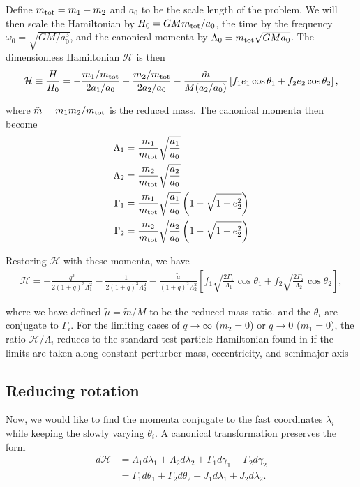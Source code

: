 \documentclass[usenatbib,twocolumn]{mnras}
\begin{document}
\noindent Define \(m_{\rm tot} = m_1+m_2\) and \(a_0\) to be the
scale length of the problem.  We will then scale the Hamiltonian by
\(H_0 = GMm_{\rm tot}/a_0\), the time by the frequency \(\omega_0 =
\sqrt{GM/a_0^3}\), and the canonical momenta by \(\Lambda_0 = m_{\rm
tot} \sqrt{GMa_0}\).  The dimensionless Hamiltonian \(\mathcal{H}\) is
then
\begin{align}
  \mathcal{H} \equiv \frac{H}{H_0}
  = -\frac{m_1/m_{\rm tot}}{2a_1/a_0}
    -\frac{m_2/m_{\rm tot}}{2a_2/a_0}
  -\frac{\tilde m}{M (a_2/a_0)}\left[
    f_1e_1\cos\theta_1+f_2e_2\cos\theta_2
    \right],
\end{align}

\noindent
where \(\tilde m = m_1m_2/m_{\rm tot}\) is the reduced mass.
The canonical momenta then become
\begin{align}
  \Lambda_1 &= \frac{m_1}{m_{\rm tot}}\sqrt{\frac{a_1}{a_0}} \\
  \Lambda_2 &= \frac{m_2}{m_{\rm tot}}\sqrt{\frac{a_2}{a_0}} \\
  \Gamma_1 &= \frac{m_1}{m_{\rm tot}}\sqrt{\frac{a_1}{a_0}}
             \left(1-\sqrt{1-e_2^2}\right) \\
  \Gamma_2 &= \frac{m_2}{m_{\rm tot}}\sqrt{\frac{a_2}{a_0}}
             \left(1-\sqrt{1-e_2^2}\right)
\end{align}

\noindent
Restoring \(\mathcal{H}\) with these momenta, we have
\begin{align}
\label{eq:H_1}
  \mathcal{H}
  = -\frac{q^3}{2(1+q)^3 \Lambda_1^2}
    - \frac{1}{2(1+q)^3\Lambda_2^2}
   - \frac{\tilde\mu}{(1+q)^2 \Lambda_2^2}\left[
    f_1\sqrt{\frac{2\Gamma_1}{\Lambda_1}}\cos\theta_1
    +f_2\sqrt{\frac{2\Gamma_2}{\Lambda_2}}\cos\theta_2
    \right],
\end{align}

\noindent where we have defined \(\tilde\mu=\tilde m/M\) to be
the reduced mass ratio.  and the \(\theta_i\) are conjugate to
\(\Gamma_i\).  For the limiting cases of \(q\to \infty\) (\(m_2=0\)) or
\(q\to 0\) (\(m_1=0\)), the ratio \(\mathcal{H}/\Lambda_i\) reduces to the
standard test particle Hamiltonian found in \citet{murray_solar_2000} if
the limits are taken along constant perturber mass, eccentricity, and semimajor axis
\citep[e.g.,][]{moutamid14_coupl_between_corot_lindb_reson,deck13_first_order_reson_overl_stabil}
\subsection{Reducing rotation}
\label{sec:org84fe193}
Now, we would like to find the momenta conjugate to the fast
coordinates \(\lambda_i\) while keeping the slowly varying \(\theta_i\).
A canonical transformation preserves the form
\begin{align}
  \label{eq:dH} 
  d\mathcal{H}
  &= \Lambda_1 d\lambda_1+\Lambda_2d\lambda_2
    + \Gamma_1d\gamma_1+\Gamma_2d\gamma_2\nonumber\\
  &= \Gamma_1 d\theta_1 + \Gamma_2 d\theta_2
    +J_1 d\lambda_1+J_2d\lambda_2 .
\end{align}
\end{document}
